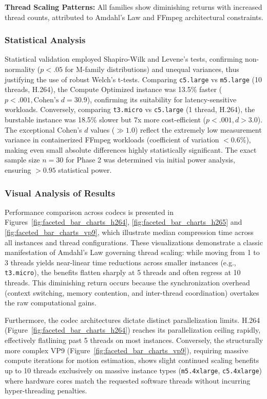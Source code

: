 \documentclass[conference]{IEEEtran}
\begin{document}
	\textbf{Thread Scaling Patterns:} All families show diminishing returns with increased thread counts, attributed to Amdahl's Law and FFmpeg architectural constraints.
	
	\subsubsection{Statistical Analysis}
	
	Statistical validation employed Shapiro-Wilk and Levene's tests, confirming non-normality ($p < .05$ for M-family distributions) and unequal variances, thus justifying the use of robust Welch's t-tests. Comparing \texttt{c5.large} vs \texttt{m5.large} (10 threads, H.264), the Compute Optimized instance was 13.5\% faster ($p < .001, \text{Cohen's } d = 30.9$), confirming its suitability for latency-sensitive workloads. Conversely, comparing \texttt{t3.micro} vs \texttt{c5.large} (1 thread, H.264), the burstable instance was 18.5\% slower but 7x more cost-efficient ($p < .001, d > 3.0$). The exceptional Cohen's $d$ values ($\gg 1.0$) reflect the extremely low measurement variance in containerized FFmpeg workloads (coefficient of variation $< 0.6\%$), making even small absolute differences highly statistically significant. The exact sample size $n=30$ for Phase 2 was determined via initial power analysis, ensuring $>0.95$ statistical power.
	
	\subsubsection{Visual Analysis of Results}
	
	Performance comparison across codecs is presented in Figures~\ref{fig:faceted_bar_charts_h264}, \ref{fig:faceted_bar_charts_h265} and \ref{fig:faceted_bar_charts_vp9}, which illustrate median compression time across all instances and thread configurations. These visualizations demonstrate a classic manifestation of Amdahl's Law governing thread scaling: while moving from 1 to 3 threads yields near-linear time reductions across smaller instances (e.g., \texttt{t3.micro}), the benefits flatten sharply at 5 threads and often regress at 10 threads. This diminishing return occurs because the synchronization overhead (context switching, memory contention, and inter-thread coordination) overtakes the raw computational gains. 
	
	Furthermore, the codec architectures dictate distinct parallelization limits. H.264 (Figure~\ref{fig:faceted_bar_charts_h264}) reaches its parallelization ceiling rapidly, effectively flatlining past 5 threads on most instances. Conversely, the structurally more complex VP9 (Figure~\ref{fig:faceted_bar_charts_vp9}), requiring massive compute iterations for motion estimation, shows slight continued scaling benefits up to 10 threads exclusively on massive instance types (\texttt{m5.4xlarge}, \texttt{c5.4xlarge}) where hardware cores match the requested software threads without incurring hyper-threading penalties.
	
\end{document}
